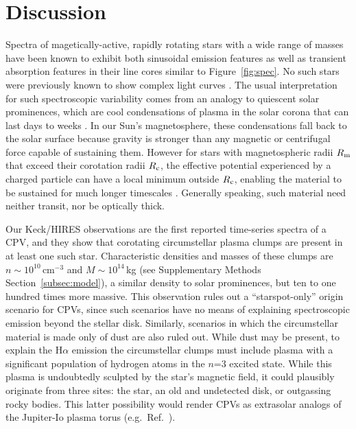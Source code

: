 \documentclass{nature3}
\begin{document}
\section{Discussion}

Spectra of magetically-active, rapidly rotating stars with a wide range
of masses have been known to exhibit both sinusoidal emission features
\cite{Donati2000,Townsend2005,Dunstone2006,Skelly2008} as well as
transient absorption features in their line cores
\cite{CollierCameron1989,CollierCameron1992,Cang2020} similar to
Figure~\ref{fig:spec}.  No such stars were previously known to show
complex light curves \cite{Bouma2024}.  The usual interpretation for
such spectroscopic variability comes from an analogy to quiescent solar
prominences, which are cool condensations of plasma in the solar corona
that can last days to weeks \cite{VialEngvold2015}.  In our Sun's
magnetosphere, these condensations fall back to the solar surface
because gravity is stronger than any magnetic or centrifugal force
capable of sustaining them.  However for stars with magnetospheric radii
$R_{\rm m}$ that exceed their corotation radii $R_{\rm c}$, the
effective potential experienced by a charged particle can have a local
minimum outside $R_{\rm c}$, enabling the material to be sustained for
much longer timescales \cite{Petit2013,Daley-Yates2024}.  Generally
speaking, such material need neither transit, nor be optically thick.

Our Keck/HIRES observations are the first reported time-series
spectra of a CPV, and they show that corotating circumstellar plasma clumps 
are present in at least one such star.
Characteristic densities and masses of these
clumps are $n \sim 10^{10}$\,cm$^{-3}$ and $M \sim 10^{14}$\,kg (see
Supplementary Methods Section~\ref{subsec:model}), a similar density
to solar prominences, but ten to one hundred times more massive.  This
observation rules out a ``starspot-only'' origin scenario for CPVs,
\cite{Koen2021} since such scenarios have no means of explaining
spectroscopic emission beyond the stellar disk.  Similarly, scenarios
in which the circumstellar material is made only of dust are also
ruled out.  While dust may be present, to explain the H$\alpha$
emission the circumstellar clumps must include plasma with a
significant population of hydrogen atoms in the $n$=3 excited state.
While this plasma is undoubtedly sculpted by the star's magnetic
field, it could plausibly originate from three sites: the star, an old
and undetected disk, or outgassing rocky bodies.  This latter
possibility would render CPVs as extrasolar analogs of the Jupiter-Io
plasma torus (e.g.~Ref.~\cite{Bagenal1981}).
\end{document}
